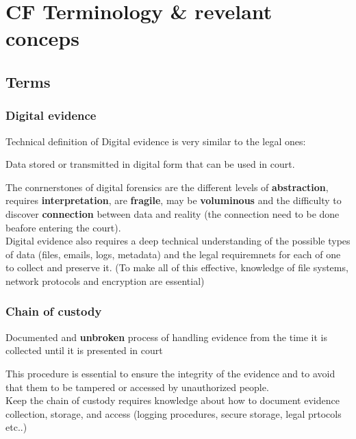 \chapter{CF Terminology \& revelant conceps}

\section{Terms}

\subsection{Digital evidence}
Technical definition of Digital evidence is very similar to the legal ones:
\begin{boxH}
  Data stored or transmitted in digital form that can be used in court.
\end{boxH}

The conrnerstones of digital forensics are the different levels of \textbf{abstraction}, requires
\textbf{interpretation}, are \textbf{fragile}, may be \textbf{voluminous}
and the difficulty to discover \textbf{connection} between
data and reality (the connection need to be done beafore entering the court). \\

Digital evidence also requires a deep technical understanding of the possible types of data
(files, emails, logs, metadata) and the legal requiremnets for each of one to collect and preserve it.
(To make all of this effective, knowledge of file systems, network protocols
and encryption are essential) \\

\subsection{Chain of custody}
\begin{boxH}
  Documented and \textbf{unbroken} process of handling evidence
  from the time it is collected until it is presented in court
\end{boxH}

This procedure is essential to ensure the integrity of the evidence and to avoid
that them to be tampered or accessed by unauthorized people. \\
Keep the chain of custody requires knowledge about how to document evidence
collection, storage, and access (logging procedures, secure storage, legal prtocols etc..) \\

